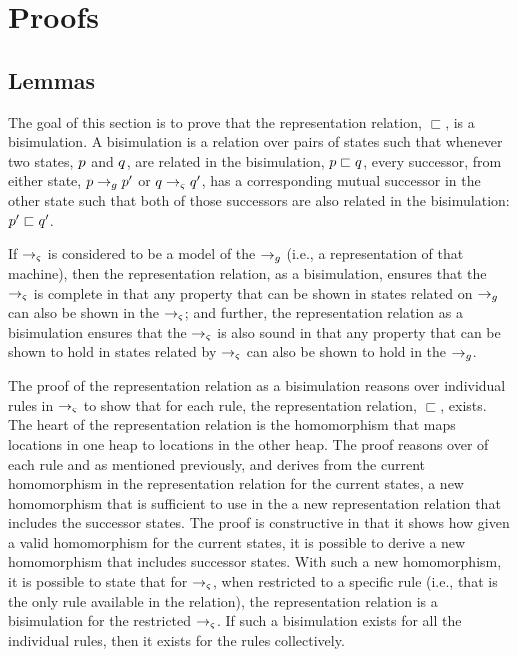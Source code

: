 \section{Proofs}
\label{sec:proofs}
\subsection{Lemmas}

The goal of this section is to prove that the representation relation,
$\sqsubset$, is a bisimulation.  A bisimulation is a relation over pairs of states such that whenever two states, $p$ and
$q$, are related in the bisimulation, $p \sqsubset
q$, every successor, from either state, $p
\rightarrow_{g} p^\prime$ or $q \rightarrow_{\varsigma}
q^\prime$, has a corresponding mutual successor in the other
state such that both of those successors are also related in the
bisimulation: $p^\prime \sqsubset q^\prime$.

If $\rightarrow_{\varsigma}$ is considered to be a model of the
$\rightarrow_{g}$ (i.e., a representation of that machine), then the
representation relation, as a bisimulation, ensures that the
$\rightarrow_{\varsigma}$ is complete in that any property that can be
shown in states related on $\rightarrow_{g}$ can also be shown in the
$\rightarrow_{\varsigma}$; and further, the representation relation as a
bisimulation ensures that the $\rightarrow_{\varsigma}$ is also sound in
that any property that can be shown to hold in states related by $\rightarrow_{\varsigma}$
can also be shown to hold in the $\rightarrow_{g}$.

The proof of the representation relation as a bisimulation reasons
over individual rules in $\rightarrow_{\varsigma}$ to show that for
each rule, the representation relation, $\sqsubset$, exists. The heart
of the representation relation is the homomorphism that maps locations
in one heap to locations in the other heap. The proof reasons over of
each rule and as mentioned previously, and derives from the current
homomorphism in the representation relation for the current states, a
new homomorphism that is sufficient to use in the a new representation
relation that includes the successor states. The proof is constructive
in that it shows how given a valid homomorphism for the current
states, it is possible to derive a new homomorphism that includes
successor states. With such a new homomorphism, it is possible to
state that for $\rightarrow_{\varsigma}$, when restricted to a specific
rule (i.e., that is the only rule available in the relation), the
representation relation is a bisimulation for the restricted
$\rightarrow_{\varsigma}$. If such a bisimulation exists for all the
individual rules, then it exists for the rules collectively.

